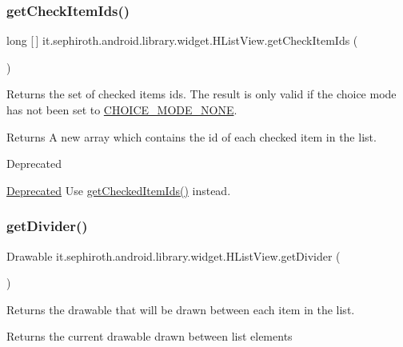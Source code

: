 \subsubsection{\texorpdfstring{get\+Check\+Item\+Ids()}{getCheckItemIds()}}
{\footnotesize\ttfamily long \mbox{[}$\,$\mbox{]} it.\+sephiroth.\+android.\+library.\+widget.\+H\+List\+View.\+get\+Check\+Item\+Ids (\begin{DoxyParamCaption}{ }\end{DoxyParamCaption})}

Returns the set of checked items ids. The result is only valid if the choice mode has not been set to \hyperlink{}{C\+H\+O\+I\+C\+E\+\_\+\+M\+O\+D\+E\+\_\+\+N\+O\+NE}.

\begin{DoxyReturn}{Returns}
A new array which contains the id of each checked item in the list.
\end{DoxyReturn}
\begin{DoxyRefDesc}{Deprecated}
\item[\hyperlink{deprecated__deprecated000001}{Deprecated}]Use \hyperlink{classit_1_1sephiroth_1_1android_1_1library_1_1widget_1_1_abs_h_list_view_a7a212bc367d2dc31f48e313e6f3ef9cf}{get\+Checked\+Item\+Ids()} instead. \end{DoxyRefDesc}
\mbox{\label{classit_1_1sephiroth_1_1android_1_1library_1_1widget_1_1_h_list_view_a37b13af27418111a802770df39f20f4d}} 
\subsubsection{\texorpdfstring{get\+Divider()}{getDivider()}}
{\footnotesize\ttfamily Drawable it.\+sephiroth.\+android.\+library.\+widget.\+H\+List\+View.\+get\+Divider (\begin{DoxyParamCaption}{ }\end{DoxyParamCaption})}

Returns the drawable that will be drawn between each item in the list.

\begin{DoxyReturn}{Returns}
the current drawable drawn between list elements 
\end{DoxyReturn}
\mbox{\label{classit_1_1sephiroth_1_1android_1_1library_1_1widget_1_1_h_list_view_abdfb8bbcc37c4748105026d76569f35b}} 
